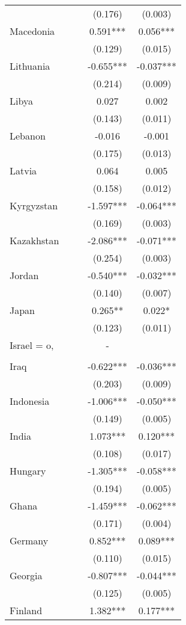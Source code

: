 \documentclass[]{article}
\begin{document}
\begin{tabular}{lcccc}
 &  &  & (0.176) & (0.003) \\
Macedonia &  &  & 0.591*** & 0.056*** \\
 &  &  & (0.129) & (0.015) \\
Lithuania &  &  & -0.655*** & -0.037*** \\
 &  &  & (0.214) & (0.009) \\
Libya &  &  & 0.027 & 0.002 \\
 &  &  & (0.143) & (0.011) \\
Lebanon &  &  & -0.016 & -0.001 \\
 &  &  & (0.175) & (0.013) \\
Latvia &  &  & 0.064 & 0.005 \\
 &  &  & (0.158) & (0.012) \\
Kyrgyzstan &  &  & -1.597*** & -0.064*** \\
 &  &  & (0.169) & (0.003) \\
Kazakhstan &  &  & -2.086*** & -0.071*** \\
 &  &  & (0.254) & (0.003) \\
Jordan &  &  & -0.540*** & -0.032*** \\
 &  &  & (0.140) & (0.007) \\
Japan &  &  & 0.265** & 0.022* \\
 &  &  & (0.123) & (0.011) \\
Israel = o, &  &  & - &  \\
 &  &  &  &  \\
Iraq &  &  & -0.622*** & -0.036*** \\
 &  &  & (0.203) & (0.009) \\
Indonesia &  &  & -1.006*** & -0.050*** \\
 &  &  & (0.149) & (0.005) \\
India &  &  & 1.073*** & 0.120*** \\
 &  &  & (0.108) & (0.017) \\
Hungary &  &  & -1.305*** & -0.058*** \\
 &  &  & (0.194) & (0.005) \\
Ghana &  &  & -1.459*** & -0.062*** \\
 &  &  & (0.171) & (0.004) \\
Germany &  &  & 0.852*** & 0.089*** \\
 &  &  & (0.110) & (0.015) \\
Georgia &  &  & -0.807*** & -0.044*** \\
 &  &  & (0.125) & (0.005) \\
Finland &  &  & 1.382*** & 0.177*** \\

\end{tabular}
\end{document}
